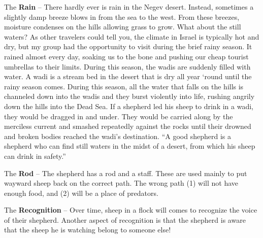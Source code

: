 \begin{compactenum}[I.]
    \item The \textbf{Rain} -- There hardly ever is rain in the Negev desert. Instead, sometimes a slightly damp breeze blows in from the sea to the west.  From these breezes, moisture condenses on the hills allowing grass to grow.  What about the still waters? As other travelers could tell you, the climate in Israel is typically hot and dry, but my group had the opportunity to visit during the brief rainy season. It rained almost every day, soaking us to the bone and pushing our cheap tourist umbrellas to their limits. During this season, the wadis are suddenly filled with water. A wadi is a stream bed in the desert that is dry all year `round until the rainy season comes. During this season, all the water that falls on the hills is channeled down into the wadis and they burst violently into life, rushing angrily down the hills into the Dead Sea.  If a shepherd led his sheep to drink in a wadi, they would be dragged in and under. They would be carried along by the merciless current and smashed repeatedly against the rocks until their drowned and broken bodies reached the wadi's destination. ``A good shepherd is a shepherd who can find still waters in the midst of a desert, from which his sheep can drink in safety.''
    \item The \textbf{Rod} -- The shepherd has a rod and a staff. These are used mainly to put wayward sheep back on the correct path. The wrong path (1) will not have enough food, and (2) will be a place of predators.
    \item The \textbf{Recognition} -- Over time, sheep in a flock will comes to recognize the voice of their shepherd. Another aspect of recognition is that the shepherd is aware that the sheep he is watching belong to someone else!
\end{compactenum}

